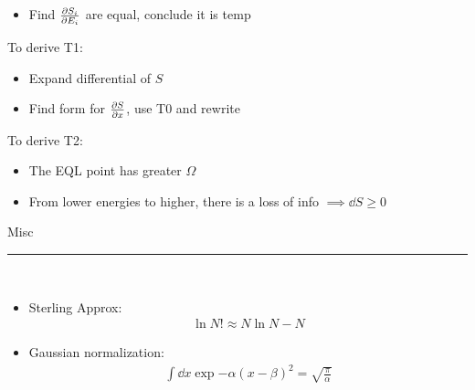 \documentclass[8pt]{article}
\begin{document}
\begin{multicols*}{2}
\begin{itemize}
  \item Find $\pdv{S_i}{E_i}$ are equal, conclude it is temp
  \end{itemize}
  To derive T1:
  \begin{itemize}
  \item Expand differential of $S$
  \item Find form for $\pdv{S}{x}$, use T0 and rewrite 
  \end{itemize}
  To derive T2:
  \begin{itemize}
  \item The EQL point has greater $\Omega$
  \item From lower energies to higher, there is a loss of info $\implies\dd{S}\geq0$
  \end{itemize}
  \begin{center}
    \normalsize{Misc}
  \end{center}
  \hrule~\\
  \begin{itemize}
  \item Sterling Approx:
    \begin{gather*}
      \ln N!\approx N\ln N-N
    \end{gather*}
  \item Gaussian normalization:
  \begin{gather*}
    \int\dd{x}\exp{-\alpha(x-\beta)^2}=\sqrt{\frac{\pi}{\alpha}}
  \end{gather*}
  
  \end{itemize}
\end{multicols*}
\end{document}
